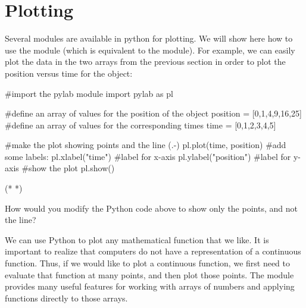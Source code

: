 \section{Plotting}
Several modules are available in python for plotting. We will show here how to use the  module (which is equivalent to the  module). For example, we can easily plot the data in the two arrays from the previous section in order to plot the position versus time for the object:
\begin{python}[caption=Plotting two arrays]
#import the pylab module
import pylab as pl

#define an array of values for the position of the object
position = [0,1,4,9,16,25]
#define an array of values for the corresponding times
time = [0,1,2,3,4,5]

#make the plot showing points and the line (.-)
pl.plot(time, position)
#add some labels:
pl.xlabel("time") #label for x-axis
pl.ylabel("position") #label for y-axis
#show the plot
pl.show()

\end{python}
\begin{poutput}
(*   *)
\end{poutput}

\begin{checkpoint}{How would you modify the Python code above to show only the points, and not the line?}
\end{checkpoint}

We can use Python to plot any mathematical function that we like. It is important to realize that computers do not have a representation of a continuous function. Thus, if we would like to plot a continuous function, we first need to evaluate that function at many points, and then plot those points. The  module provides many useful features for working with arrays of numbers and applying functions directly to those arrays. 

